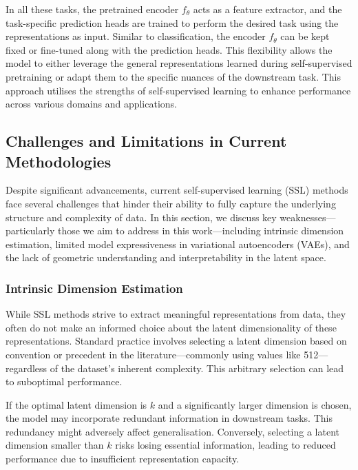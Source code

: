 In all these tasks, the pretrained encoder \( f_{\theta} \) acts as a feature extractor, and the task-specific prediction heads are trained to perform the desired task using the representations as input. Similar to classification, the encoder \( f_{\theta} \) can be kept fixed or fine-tuned along with the prediction heads. This flexibility allows the model to either leverage the general representations learned during self-supervised pretraining or adapt them to the specific nuances of the downstream task. This approach utilises the strengths of self-supervised learning to enhance performance across various domains and applications.

\subsection{Challenges and Limitations in Current Methodologies}

Despite significant advancements, current self-supervised learning (SSL) methods face several challenges that hinder their ability to fully capture the underlying structure and complexity of data. In this section, we discuss key weaknesses—particularly those we aim to address in this work—including intrinsic dimension estimation, limited model expressiveness in variational autoencoders (VAEs), and the lack of geometric understanding and interpretability in the latent space.

\subsubsection{Intrinsic Dimension Estimation}

While SSL methods strive to extract meaningful representations from data, they often do not make an informed choice about the latent dimensionality of these representations. Standard practice involves selecting a latent dimension based on convention or precedent in the literature—commonly using values like 512—regardless of the dataset's inherent complexity. This arbitrary selection can lead to suboptimal performance.

If the optimal latent dimension is \( k \) and a significantly larger dimension is chosen, the model may incorporate redundant information in downstream tasks. This redundancy might adversely affect generalisation. Conversely, selecting a latent dimension smaller than \( k \) risks losing essential information, leading to reduced performance due to insufficient representation capacity.

